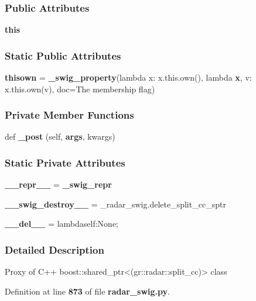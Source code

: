 \subsubsection*{Public Attributes}
\begin{DoxyCompactItemize}
\item 
{\bf this}
\end{DoxyCompactItemize}
\subsubsection*{Static Public Attributes}
\begin{DoxyCompactItemize}
\item 
{\bf thisown} = {\bf \+\_\+swig\+\_\+property}(lambda x\+: x.\+this.\+own(), lambda {\bf x}, v\+: x.\+this.\+own(v), doc=\textquotesingle{}The membership flag\textquotesingle{})
\end{DoxyCompactItemize}
\subsubsection*{Private Member Functions}
\begin{DoxyCompactItemize}
\item 
def {\bf \+\_\+post} (self, {\bf args}, kwargs)
\end{DoxyCompactItemize}
\subsubsection*{Static Private Attributes}
\begin{DoxyCompactItemize}
\item 
{\bf \+\_\+\+\_\+repr\+\_\+\+\_\+} = {\bf \+\_\+swig\+\_\+repr}
\item 
{\bf \+\_\+\+\_\+swig\+\_\+destroy\+\_\+\+\_\+} = \+\_\+radar\+\_\+swig.\+delete\+\_\+split\+\_\+cc\+\_\+sptr
\item 
{\bf \+\_\+\+\_\+del\+\_\+\+\_\+} = lambdaself\+:\+None;
\end{DoxyCompactItemize}


\subsubsection{Detailed Description}
\begin{DoxyVerb}Proxy of C++ boost::shared_ptr<(gr::radar::split_cc)> class\end{DoxyVerb}
 

Definition at line {\bf 873} of file {\bf radar\+\_\+swig.\+py}.



